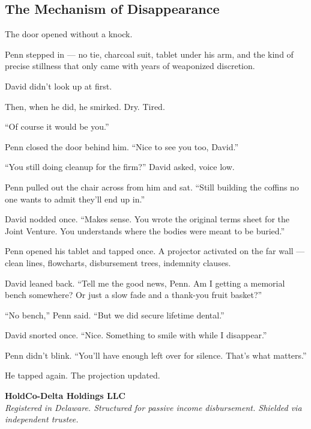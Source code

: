 
\subsection{The Mechanism of Disappearance}

The door opened without a knock.

Penn stepped in — no tie, charcoal suit, tablet under his arm, and the kind of precise stillness 
that only came with years of weaponized discretion.

David didn’t look up at first.

Then, when he did, he smirked. Dry. Tired.

``Of course it would be you.''

Penn closed the door behind him. ``Nice to see you too, David.''

``You still doing cleanup for the firm?'' David asked, voice low.

Penn pulled out the chair across from him and sat. ``Still building the coffins no one wants 
to admit they’ll end up in.''

David nodded once. ``Makes sense. You wrote the original terms sheet for the Joint Venture. You 
understands where the bodies were meant to be buried.''

Penn opened his tablet and tapped once. A projector activated on the far wall — clean lines, 
flowcharts, disbursement trees, indemnity clauses.

David leaned back. ``Tell me the good news, Penn. Am I getting a memorial bench somewhere? 
Or just a slow fade and a thank-you fruit basket?''

``No bench,'' Penn said. ``But we did secure lifetime dental.''

David snorted once. ``Nice. Something to smile with while I disappear.''

Penn didn’t blink. ``You’ll have enough left over for silence. That’s what matters.''

He tapped again. The projection updated.

\textbf{HoldCo-Delta Holdings LLC} \\
\textit{Registered in Delaware. Structured for passive income disbursement. Shielded via independent trustee.}

\vspace{1em}

